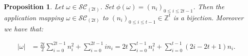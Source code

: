 \documentclass[11pt,letterpaper]{amsart}
\def\ccsc{\mathcal {SC}}
\newtheorem{prop}[df]{Proposition}		%
\numberwithin{equation}{section}
\numberwithin{df}{section}
\begin{document}
\begin{prop}\label{prop:sc2t}
Let $\omega\in \ccsc_{(2t)}$. Set $\phi(\omega)=(n_i)_{0\leq i\leq 2t-1}$. Then the application mapping $\omega\in\ccsc_{(2t)}$ to $(n_i)_{0\leq i\leq t-1}\in\mathbb{Z}^t$ is a bijection. Moreover we have that:

\begin{align}
\lvert \omega \rvert &=\frac{2t}{2}\sum_{i=0}^{2t-1}n_i^2+\sum_{i=0}^{2t-1}in_i=2t\sum_{i=0}^{t-1}n_i^2+\sum_{i=0}^{t-1}(2i-2t+1)n_i.\label{eq:gkscpair}
\end{align}

\end{prop}


\end{document}
